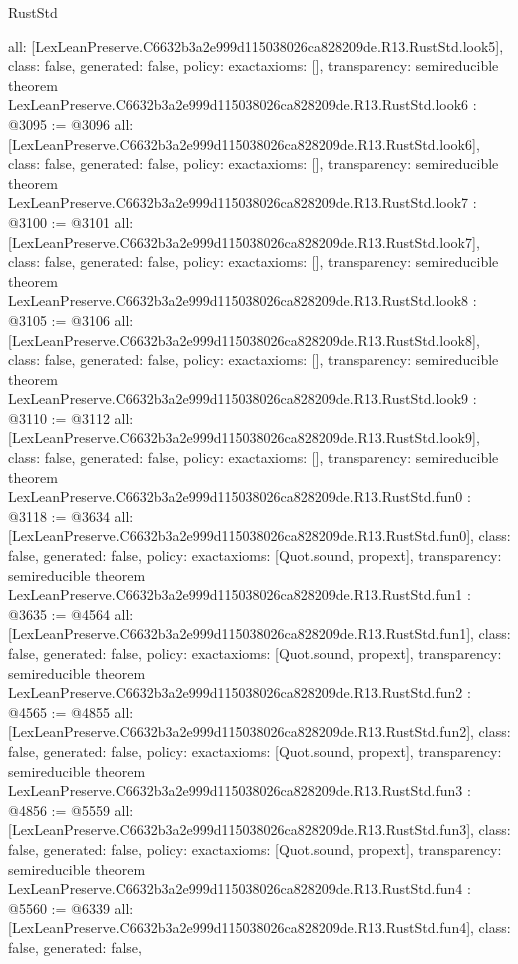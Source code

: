 \begin{lexlean}{RustStd}
\begin{coremodule}
{  all: [LexLeanPreserve.C6632b3a2e999d115038026ca828209de.R13.RustStd.look5],
  class: false,
  generated: false,
  policy: exact{axioms: []},
  transparency: semireducible
}
theorem LexLeanPreserve.C6632b3a2e999d115038026ca828209de.R13.RustStd.look6 : @3095 := @3096 {
  all: [LexLeanPreserve.C6632b3a2e999d115038026ca828209de.R13.RustStd.look6],
  class: false,
  generated: false,
  policy: exact{axioms: []},
  transparency: semireducible
}
theorem LexLeanPreserve.C6632b3a2e999d115038026ca828209de.R13.RustStd.look7 : @3100 := @3101 {
  all: [LexLeanPreserve.C6632b3a2e999d115038026ca828209de.R13.RustStd.look7],
  class: false,
  generated: false,
  policy: exact{axioms: []},
  transparency: semireducible
}
theorem LexLeanPreserve.C6632b3a2e999d115038026ca828209de.R13.RustStd.look8 : @3105 := @3106 {
  all: [LexLeanPreserve.C6632b3a2e999d115038026ca828209de.R13.RustStd.look8],
  class: false,
  generated: false,
  policy: exact{axioms: []},
  transparency: semireducible
}
theorem LexLeanPreserve.C6632b3a2e999d115038026ca828209de.R13.RustStd.look9 : @3110 := @3112 {
  all: [LexLeanPreserve.C6632b3a2e999d115038026ca828209de.R13.RustStd.look9],
  class: false,
  generated: false,
  policy: exact{axioms: []},
  transparency: semireducible
}
theorem LexLeanPreserve.C6632b3a2e999d115038026ca828209de.R13.RustStd.fun0 : @3118 := @3634 {
  all: [LexLeanPreserve.C6632b3a2e999d115038026ca828209de.R13.RustStd.fun0],
  class: false,
  generated: false,
  policy: exact{axioms: [Quot.sound, propext]},
  transparency: semireducible
}
theorem LexLeanPreserve.C6632b3a2e999d115038026ca828209de.R13.RustStd.fun1 : @3635 := @4564 {
  all: [LexLeanPreserve.C6632b3a2e999d115038026ca828209de.R13.RustStd.fun1],
  class: false,
  generated: false,
  policy: exact{axioms: [Quot.sound, propext]},
  transparency: semireducible
}
theorem LexLeanPreserve.C6632b3a2e999d115038026ca828209de.R13.RustStd.fun2 : @4565 := @4855 {
  all: [LexLeanPreserve.C6632b3a2e999d115038026ca828209de.R13.RustStd.fun2],
  class: false,
  generated: false,
  policy: exact{axioms: [Quot.sound, propext]},
  transparency: semireducible
}
theorem LexLeanPreserve.C6632b3a2e999d115038026ca828209de.R13.RustStd.fun3 : @4856 := @5559 {
  all: [LexLeanPreserve.C6632b3a2e999d115038026ca828209de.R13.RustStd.fun3],
  class: false,
  generated: false,
  policy: exact{axioms: [Quot.sound, propext]},
  transparency: semireducible
}
theorem LexLeanPreserve.C6632b3a2e999d115038026ca828209de.R13.RustStd.fun4 : @5560 := @6339 {
  all: [LexLeanPreserve.C6632b3a2e999d115038026ca828209de.R13.RustStd.fun4],
  class: false,
  generated: false,
}
\end{coremodule}
\end{lexlean}
